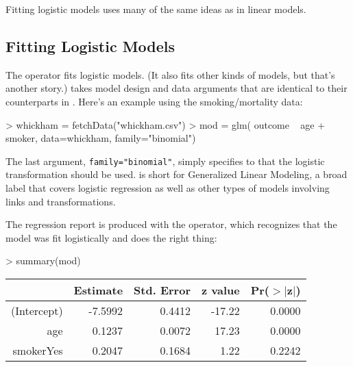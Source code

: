 

 
Fitting logistic models uses many of the same ideas as in linear
models.

\subsection{Fitting Logistic Models}

The  operator fits logistic models.  (It also fits other
kinds of models, but that's another story.)   takes model
design and data arguments that are identical to their counterparts in
.  Here's an example using the smoking/mortality data: \datasetWhickham
\begin{Schunk}
\begin{Sinput}
> whickham = fetchData("whickham.csv")
> mod = glm( outcome ~ age + smoker, data=whickham, 
     family="binomial")
\end{Sinput}
\end{Schunk}
The last argument, \texttt{family="binomial"}, simply specifies to
 that the logistic transformation should be used.
 is short for Generalized Linear Modeling, a broad label
that covers logistic regression as well as other types of models
involving links and transformations.

The regression report is produced with the  operator,
which recognizes that the model was fit logistically and does the
right thing:
\begin{Schunk}
\begin{Sinput}
> summary(mod)
\end{Sinput}
\end{Schunk}

\begin{tabular}{rrrrr}
  \hline
 & Estimate & Std. Error & z value & Pr($>$$|$z$|$) \\ 
  \hline
(Intercept) & -7.5992 & 0.4412 & -17.22 & 0.0000 \\ 
  age & 0.1237 & 0.0072 & 17.23 & 0.0000 \\ 
  smokerYes & 0.2047 & 0.1684 & 1.22 & 0.2242 \\ 
   \hline
\end{tabular}

